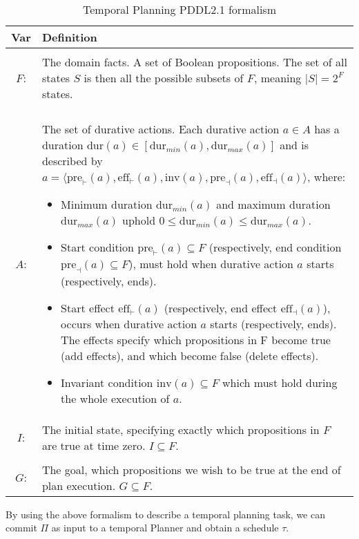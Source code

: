 \begin{table}[ht!]
\centering
\begin{tabularx}{\textwidth}{ c  X }

\textbf{Var}  & \textbf{Definition} \\
\hline
\\
$F$:     &  {The domain facts. A set of Boolean propositions. The set of all states $S$ is then all the possible subsets of $F$, meaning $\mid S \mid = 2^F$ states.}  \\
\\
    $A$:     & {The set of durative actions. Each durative action $a \in A$ has a duration $\text{dur}(a) \in [\text{dur}_{min}(a), \text{dur}_{max}(a)]$ and is described by $a=\langle \text{pre}_{\vdash}(a), \text{eff}_{\vdash}(a),\text{inv}(a),\text{pre}_{\dashv}(a), \text{eff}_{\dashv}(a)\rangle$, where:
    \begin{itemize}
        \item Minimum duration $\text{dur}_{min}(a)$ and maximum duration $\text{dur}_{max}(a)$ uphold $0 \leq \text{dur}_{min}(a) \leq \text{dur}_{max}(a)$.
        \item Start condition $\text{pre}_{\vdash}(a) \subseteq F$ (respectively, end condition $\text{pre}_{\dashv}(a)  \subseteq F$), must hold when durative action $a$ starts (respectively, ends).
        \item Start effect $\text{eff}_{\vdash}(a)$ (respectively, end effect $\text{eff}_{\dashv}(a)$), occurs when durative action $a$ starts (respectively, ends). The effects specify which propositions in F become true (add effects), and which become false (delete effects).
        \item Invariant condition $\text{inv}(a) \subseteq F$ which must hold during the whole execution of $a$.
    \end{itemize}
    }      
    \\
$I$:     & {The initial state, specifying exactly which propositions in $F$ are true at time zero. $I\subseteq F$.}      \\
\\
$G$:     & {The goal, which propositions we wish to be true at the end of plan execution. $G \subseteq F$. }   \\

\end{tabularx}
\caption{Temporal Planning PDDL2.1 formalism}
\label{tab:strips}
\end{table}

By using the above formalism to describe a temporal planning task, we can commit
$\Pi$ as input to a temporal Planner and obtain a schedule $\tau$.\\